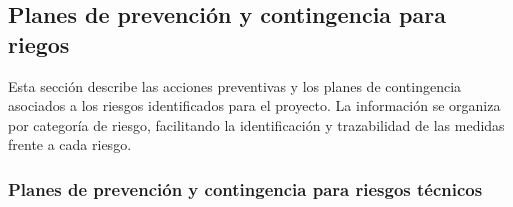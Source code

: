 \newpage
\subsection{Planes de prevención y contingencia para riegos}

Esta sección describe las acciones preventivas y los planes de contingencia asociados a los riesgos identificados para el proyecto. La información se organiza por categoría de riesgo, facilitando la identificación y trazabilidad de las medidas frente a cada riesgo.

\subsubsection{Planes de prevención y contingencia para riesgos técnicos}

\setlength{\tabcolsep}{4pt}
\renewcommand{\arraystretch}{1.2}

